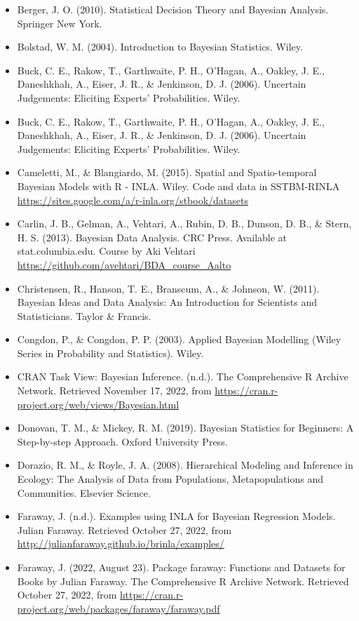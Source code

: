 \documentclass[
]{book}
\begin{document}
\begin{itemize}
\item
  Berger, J. O. (2010). Statistical Decision Theory and Bayesian Analysis. Springer New York.
\item
  Bolstad, W. M. (2004). Introduction to Bayesian Statistics. Wiley.
\item
  Buck, C. E., Rakow, T., Garthwaite, P. H., O'Hagan, A., Oakley, J. E., Daneshkhah, A., Eiser, J. R., \& Jenkinson, D. J. (2006). Uncertain Judgements: Eliciting Experts' Probabilities. Wiley.
\item
  Buck, C. E., Rakow, T., Garthwaite, P. H., O'Hagan, A., Oakley, J. E., Daneshkhah, A., Eiser, J. R., \& Jenkinson, D. J. (2006). Uncertain Judgements: Eliciting Experts' Probabilities. Wiley.
\item
  Cameletti, M., \& Blangiardo, M. (2015). Spatial and Spatio-temporal Bayesian Models with R - INLA. Wiley. Code and data in SSTBM-RINLA \url{https://sites.google.com/a/r-inla.org/stbook/datasets}
\item
  Carlin, J. B., Gelman, A., Vehtari, A., Rubin, D. B., Dunson, D. B., \& Stern, H. S. (2013). Bayesian Data Analysis. CRC Press. Available at stat.columbia.edu. Course by Aki Vehtari \url{https://github.com/avehtari/BDA_course_Aalto}
\item
  Christensen, R., Hanson, T. E., Branscum, A., \& Johnson, W. (2011). Bayesian Ideas and Data Analysis: An Introduction for Scientists and Statisticians. Taylor \& Francis.
\item
  Congdon, P., \& Congdon, P. P. (2003). Applied Bayesian Modelling (Wiley Series in Probability and Statistics). Wiley.
\item
  CRAN Task View: Bayesian Inference. (n.d.). The Comprehensive R Archive Network. Retrieved November 17, 2022, from \url{https://cran.r-project.org/web/views/Bayesian.html}
\item
  Donovan, T. M., \& Mickey, R. M. (2019). Bayesian Statistics for Beginners: A Step-by-step Approach. Oxford University Press.
\item
  Dorazio, R. M., \& Royle, J. A. (2008). Hierarchical Modeling and Inference in Ecology: The Analysis of Data from Populations, Metapopulations and Communities. Elsevier Science.
\item
  Faraway, J. (n.d.). Examples using INLA for Bayesian Regression Models. Julian Faraway. Retrieved October 27, 2022, from \url{http://julianfaraway.github.io/brinla/examples/}
\item
  Faraway, J. (2022, August 23). Package faraway: Functions and Datasets for Books by Julian Faraway. The Comprehensive R Archive Network. Retrieved October 27, 2022, from \url{https://cran.r-project.org/web/packages/faraway/faraway.pdf}

\end{itemize}
\end{document}
